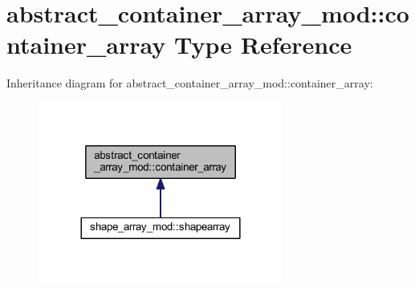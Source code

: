 \hypertarget{structabstract__container__array__mod_1_1container__array}{}\section{abstract\+\_\+container\+\_\+array\+\_\+mod\+:\+:container\+\_\+array Type Reference}
\label{structabstract__container__array__mod_1_1container__array}


Inheritance diagram for abstract\+\_\+container\+\_\+array\+\_\+mod\+:\+:container\+\_\+array\+:
\nopagebreak
\begin{figure}[H]
\begin{center}
\leavevmode
\includegraphics[width=228pt]{structabstract__container__array__mod_1_1container__array__inherit__graph}
\end{center}
\end{figure}
